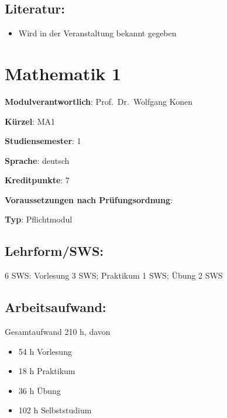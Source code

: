 \section*{Literatur:}\label{literatur-9}

\begin{itemize}
\tightlist
\item
  Wird in der Veranstaltung bekannt gegeben
\end{itemize}

\chapter{Mathematik 1}\label{mathematik-1}

\begin{modulHead}
\textbf{Modulverantwortlich}: Prof.~Dr.~Wolfgang
Konen
\end{modulHead}
\begin{modulHead}
\textbf{Kürzel}:
MA1
\end{modulHead}
\begin{modulHead}
\textbf{Studiensemester}:
1
\end{modulHead}
\begin{modulHead}
\textbf{Sprache}:
deutsch
\end{modulHead}
\begin{modulHead}
\textbf{Kreditpunkte}:
7
\end{modulHead}
\begin{modulHead}
\textbf{Voraussetzungen nach
Prüfungsordnung}: ~
\end{modulHead}
\begin{modulHead}
\textbf{Typ}:
Pflichtmodul
\end{modulHead}


\section*{Lehrform/SWS:}\label{lehrformsws-13}

6 SWS: Vorlesung 3 SWS; Praktikum 1 SWS; Übung 2 SWS

\section*{Arbeitsaufwand:}\label{arbeitsaufwand-12}

Gesamtaufwand 210 h, davon

\begin{itemize}
\tightlist
\item
  54 h Vorlesung
\item
  18 h Praktikum
\item
  36 h Übung
\item
  102 h Selbststudium
\end{itemize}

